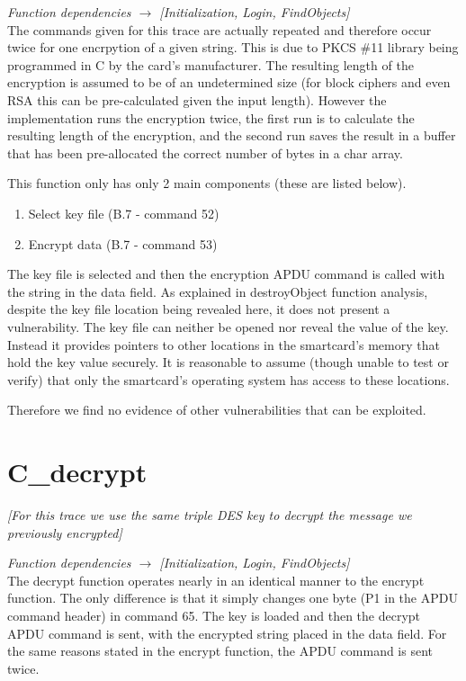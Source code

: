 \documentclass[bsc,frontabs,twoside,singlespacing,parskip,deptreport]{infthesis}     %
\begin{document}
\textit{Function dependencies $\rightarrow$ [Initialization, Login, FindObjects]}\\

The commands given for this trace are actually repeated and therefore occur twice for one encrpytion of a given string. This is due to PKCS \#11 library being programmed in C by the card's manufacturer. The resulting length of the encryption is assumed to be of an undetermined size (for block ciphers and even RSA this can be pre-calculated given the input length). However the implementation runs the encryption twice, the first run is to calculate the resulting length of the encryption, and the second run saves the result in a buffer that has been pre-allocated the correct number of bytes in a char array.

This function only has only 2 main components (these are listed below).\\

\begin{enumerate}
\item Select key file (B.7 - command 52)
\item Encrypt data (B.7 - command 53)\\
\end{enumerate}

The key file is selected and then the encryption APDU command is called with the string in the data field. As explained in destroyObject function analysis, despite the key file location being revealed here, it does not present a vulnerability. The key file can neither be opened nor reveal the value of the key. Instead it provides pointers to other locations in the smartcard's memory that hold the key value securely. It is reasonable to assume (though unable to test or verify) that only the smartcard's operating system has access to these locations.

Therefore we find no evidence of other vulnerabilities that can be exploited.

\section{C\_decrypt}
\textit{[For this trace we use the same triple DES key to decrypt the message we previously encrypted]}

\textit{Function dependencies $\rightarrow$ [Initialization, Login, FindObjects]}\\

The decrypt function operates nearly in an identical manner to the encrypt function. The only difference is that it simply changes one byte (P1 in the APDU command header) in command 65. The key is loaded and then the decrypt APDU command is sent, with the encrypted string placed in the data field. For the same reasons stated in the encrypt function, the APDU command is sent twice. 
\end{document}
